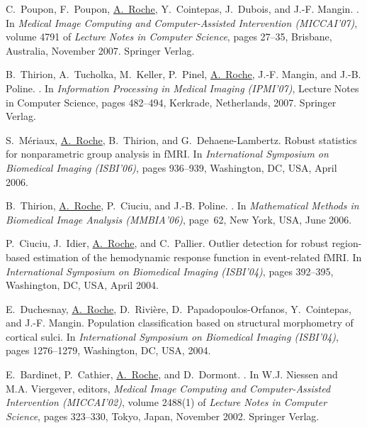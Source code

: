 \begin{thebibliography}{100}
C.~Poupon, F.~Poupon, \underline{A.~Roche}, Y.~Cointepas, J.~Dubois, and J.-F. Mangin.
.
\newblock In {\em Medical Image Computing and Computer-Assisted Intervention
  (MICCAI'07)}, volume 4791 of {\em Lecture Notes in Computer Science}, pages
  27--35, Brisbane, Australia, November 2007. Springer Verlag.

B.~Thirion, A.~Tucholka, M.~Keller, P.~Pinel, \underline{A.~Roche}, J.-F. Mangin, and J.-B.
  Poline.
.
\newblock In {\em Information Processing in Medical Imaging (IPMI'07)}, Lecture
  Notes in Computer Science, pages 482--494, Kerkrade, Netherlands, 2007.
  Springer Verlag.

S.~M\'eriaux, \underline{A.~Roche}, B.~Thirion, and G.~Dehaene-Lambertz.
\newblock Robust statistics for nonparametric group analysis in {fMRI}.
\newblock In {\em International Symposium on Biomedical Imaging (ISBI'06)},
  pages 936--939, Washington, DC, USA, April 2006.

B.~Thirion, \underline{A.~Roche}, P.~Ciuciu, and J.-B. Poline.
.
\newblock In {\em Mathematical Methods in Biomedical Image Analysis
  (MMBIA'06)}, page~62, New York, USA, June 2006.

P.~Ciuciu, J.~Idier, \underline{A.~Roche}, and C.~Pallier.
\newblock Outlier detection for robust region-based estimation of the
  hemodynamic response function in event-related f{MRI}.
\newblock In {\em International Symposium on Biomedical Imaging (ISBI'04)},
  pages 392--395, Washington, DC, USA, April 2004.

E.~Duchesnay, \underline{A.~Roche}, D.~Rivi\`ere, D.~Papadopoulos-Orfanos, Y.~Cointepas,
  and J.-F. Mangin.
\newblock Population classification based on structural morphometry of cortical
  sulci.
\newblock In {\em International Symposium on Biomedical Imaging (ISBI'04)},
  pages 1276--1279, Washington, DC, USA, 2004.

E.~Bardinet, P.~Cathier, \underline{A.~Roche}, and D.~Dormont.
.
\newblock In W.J. Niessen and M.A. Viergever, editors, {\em Medical Image
  Computing and Computer-Assisted Intervention (MICCAI'02)}, volume 2488(1) of
  {\em Lecture Notes in Computer Science}, pages 323--330, Tokyo, Japan,
  November 2002. Springer Verlag.


\end{thebibliography}
